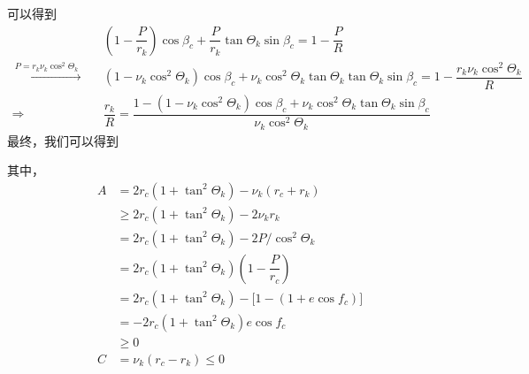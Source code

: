 可以得到
\begin{equation*}
	\begin{split}
		&\left(1 - \dfrac{P}{r_k}\right)\cos \beta_c + \dfrac{P}{r_k} \tan \varTheta_k\sin \beta_c = 1 - \dfrac{P}{R}\\
		\xrightarrow{\,\, \textstyle P = r_k\nu_k\cos^2 \varTheta_k\,\,}\quad & (1-\nu_k \cos^2 \varTheta_k)\cos \beta_c + \nu_k \cos^2 \varTheta_k\tan \varTheta_k \tan \varTheta_k \sin \beta_c = 1 - \dfrac{r_k \nu_k \cos^2 \varTheta_k}{R}\\
		\Rightarrow \quad & \dfrac{r_k}{R} = \dfrac{1 - (1-\nu_k\cos^2 \varTheta_k) \cos \beta_c + \nu_k \cos^2 \varTheta_k\tan\varTheta_k\sin \beta_c}{\nu_k \cos^2 \varTheta_k}
	\end{split}
\end{equation*}
最终，我们可以得到

其中，
\begin{equation*}
	\begin{split}
		A &= 2r_c \left(1 + \tan^2 \varTheta_k\right) - \nu_k (r_c + r_k) \\
		& \ge 2r_c \left(1 + \tan^2 \varTheta_k\right) -2 \nu_k r_k \\
		& = 2r_c \left(1 + \tan^2 \varTheta_k\right) -2P/\cos^2 \varTheta_k \\
		& = 2r_c \left(1 + \tan^2 \varTheta_k\right) \left(1 - \dfrac{P}{r_c}\right)\\
		& = 2r_c \left(1 + \tan^2 \varTheta_k\right) -\big[1 - (1 + e\cos f_c)\big]\\
		& = -2r_c \left(1 + \tan^2 \varTheta_k\right)e \cos f_c\\
		& \ge 0\\
		C &=  \nu_k (r_c - r_k) \le 0
	\end{split}
\end{equation*}

